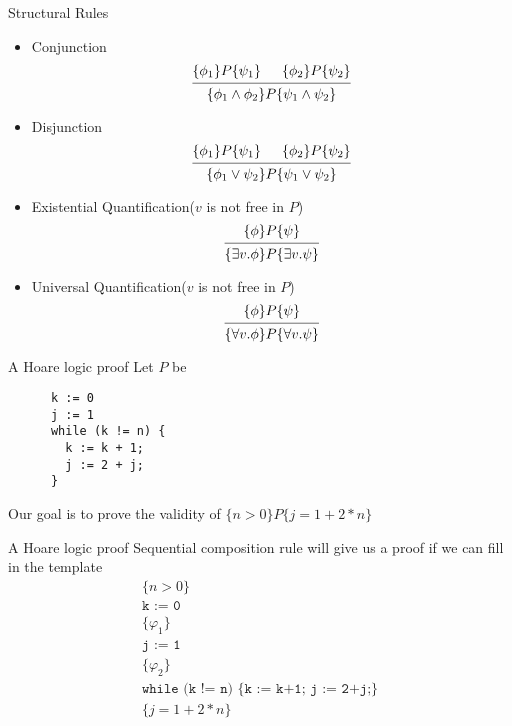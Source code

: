 \documentclass[presentation]{beamer}
\begin{document}
\begin{frame}[label={sec:org588b58f}]{Structural Rules}
\begin{itemize}
\item Conjunction
\begin{equation*}
\begin{prooftree}%
\hypo{\{\phi_1\}P\{\psi_1\}}
\hypo{\{\phi_2\}P\{\psi_2\}}
\infer2{\{\phi_1\wedge\phi_2\}P\{\psi_1\wedge\psi_2\}}
\end{prooftree}
\end{equation*}
\item Disjunction
\begin{equation*}
\begin{prooftree}%
\hypo{\{\phi_1\}P\{\psi_1\}}
\hypo{\{\phi_2\}P\{\psi_2\}}
\infer2{\{\phi_1\vee\psi_2\}P\{\psi_1\vee\psi_2\}}
\end{prooftree}
\end{equation*}
\item Existential Quantification(\(v\) is not free in \(P\))
\begin{equation*}
\begin{prooftree}%
\hypo{\{\phi\}P\{\psi\}}
\infer1{\{\exists v.\phi\}P\{\exists v.\psi\}}
\end{prooftree}
\end{equation*}
\item Universal Quantification(\(v\) is not free in \(P\))
\begin{equation*}
\begin{prooftree}%
\hypo{\{\phi\}P\{\psi\}}
\infer1{\{\forall v.\phi\}P\{\forall v.\psi\}}
\end{prooftree}
\end{equation*}
\end{itemize}
\end{frame}
\begin{frame}[label={sec:org90d6e51},fragile]{A Hoare logic proof}
 Let \(P\) be
\begin{verbatim}
      k := 0
      j := 1
      while (k != n) {
        k := k + 1;
        j := 2 + j;
      }
\end{verbatim}

Our goal is to prove the validity of \(\{n>0\}P\{j=1+2*n\}\)
\end{frame}
\begin{frame}[label={sec:org1cdecf8}]{A Hoare logic proof}
Sequential composition rule will give us a proof if we can fill in the template
\begin{gather*}
\{n>0\}\\
\texttt{k := 0}\\
\{\varphi_1\}\\
\texttt{j := 1}\\
\{\varphi_2\}\\
\texttt{while (k != n) \{k := k+1; j := 2+j;\}}\\
\{j=1+2*n\}
\end{gather*}
\end{frame}
\end{document}
